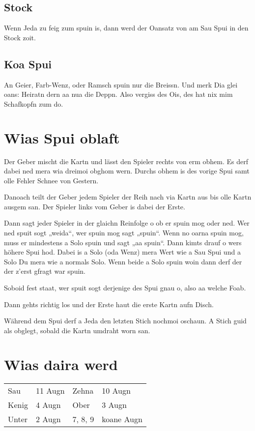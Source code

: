 \documentclass[11pt,a4paper]{scrartcl}		%
\begin{document}
		\subsection{Stock}
		Wenn Jeda zu feig zum spuin is, dann werd der Oansatz von am Sau Spui in den Stock zoit. 


		\subsection{Koa Spui}
		An Geier, Farb-Wenz, oder Ramsch spuin nur die Breissn. Und merk Dia glei oans: Heiratn dern aa nua die Deppn. Also vergiss des Ois, des hat nix mim Schafkopfn zum do.  %



	\section{Wias Spui oblaft}

	Der Geber mischt die Kartn und lässt den Spieler rechts von erm obhem. Es derf dabei ned mera wia dreimoi obghom wern. Durchs obhem is des vorige Spui samt olle Fehler Schnee von Gestern. 

	Danoach teilt der Geber jedem Spieler der Reih nach via Kartn aus bis olle Kartn ausgem san. Der Spieler links vom Geber is dabei der Erste. 

	Dann sagt jeder Spieler in der glaichn Reinfolge o ob er spuin mog oder ned. Wer ned spuit sogt „weida“, wer spuin mog sagt „spuin“. Wenn no oarna spuin mog, muss er mindestens a Solo spuin und sagt „aa spuin“. Dann kimts drauf o wers höhere Spui hod. Dabei is a Solo (oda Wenz) mera Wert wie a Sau Spui und a Solo Du mera wie a normals Solo. Wenn beide a Solo spuin woin dann derf der der z'erst gfragt war spuin.  

	Soboid fest staat, wer spuit sogt derjenige des Spui gnau o, also aa welche Foab.

	Dann gehts richtig los und der Erste haut die erste Kartn aufn Disch.


	Während dem Spui derf a Jeda den letzten Stich nochmoi oschaun.
	A Stich guid als obglegt, sobald die Kartn umdraht worn san.



	\section{Wias daira werd}

	\begin{tabular}{ll|ll}
		Sau & 11 Augn & Zehna & 10 Augn\\
		Kenig & 4 Augn &  Ober & 3 Augn\\
		Unter & 2 Augn & 7, 8, 9 & koane Augn
	\end{tabular}
\end{document}
